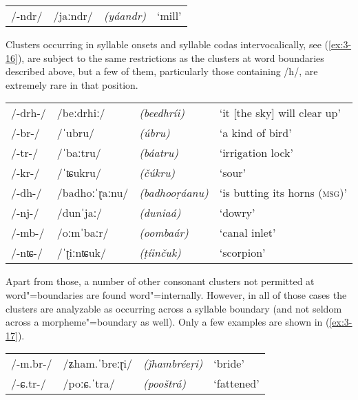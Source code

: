 \begin{exe}
\extab
\label{ex:3-15}
\begin{tabular}{ l l l l }
/-ndr/ &
/jaːndr/ &
\textit{(yáandr)} &
`mill'\\
\end{tabular}
\end{exe}


Clusters occurring in syllable onsets and syllable codas intervocalically, see (\ref{ex:3-16}), are subject to the same restrictions as the clusters at word boundaries described above, but a few of them, particularly those containing /h/, are extremely rare in that position. 


\begin{exe}
\extab
\label{ex:3-16}
\begin{tabular}{ l l l l }
/-drh-/ &
/beːdrhiː/ &
\textit{(beedhríi)} &
`it [the sky] will clear up'\\
/-br-/ &
/ˈubru/ &
\textit{(úbru)} &
`a kind of bird'\\
/-tr-/ &
/ˈbaːtru/ &
\textit{(báatru)} &
`irrigation lock'\\
/-kr-/ &
/ˈʨukru/ &
\textit{(čúkru)} &
`sour'\\
/-dh-/ &
/badhoːˈɽaːnu/ &
\textit{(badhooṛáanu)} &
`is butting its horns (\textsc{msg)}'\\
/-nj-/ &
/dunˈjaː/ &
\textit{(duniaá)} &
`dowry'\\
/-mb-/ &
/oːmˈbaːr/ &
\textit{(oombaár)} &
`canal inlet'\\
/-nʨ-/ &
/ˈʈiːnʨuk/ &
\textit{(ṭíinčuk)} &
`scorpion'\\
\end{tabular}
\end{exe}


Apart from those, a number of other consonant clusters not permitted at word"=boundaries are found word"=internally. However, in all of those cases the clusters are analyzable as occurring across a syllable boundary (and not seldom across a morpheme"=boundary as well). Only a few examples are shown in (\ref{ex:3-17}).


\begin{exe}
\extab
\label{ex:3-17}
\begin{tabular}{ l l l l }
/-m.br-/ &
/ʑham.ˈbreːɽi/ &
\textit{(ǰhambréeṛi)} &
`bride'\\
/-ɕ.tr-/ &
/poːɕ.ˈtra/ &
\textit{(pooštrá)} &
`fattened'\\

\end{tabular}
\end{exe}


